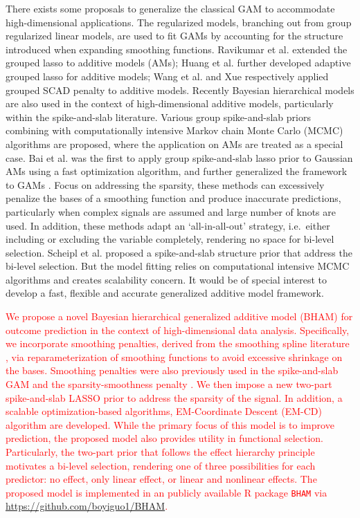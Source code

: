 \documentclass[AMA,STIX1COL,]{WileyNJD-v2}
\begin{document}
There exists some proposals to generalize the classical GAM to
accommodate high-dimensional applications. The regularized models,
branching out from group regularized linear models, are used to fit GAMs
by accounting for the structure introduced when expanding smoothing
functions. Ravikumar et al. \citep{Ravikumar2009} extended the grouped
lasso \citep{Yuan2006} to additive models (AMs); Huang et al.
\citep{Huang2010} further developed adaptive grouped lasso for additive
models; Wang et al. \citep{Wang2007} and Xue \citep{Xue2009}
respectively applied grouped SCAD penalty \citep{Fan2001} to additive
models. Recently Bayesian hierarchical models are also used in the
context of high-dimensional additive models, particularly within the
spike-and-slab literature. Various group spike-and-slab priors
\citep{Xu2015, Yang2020} combining with computationally intensive Markov
chain Monte Carlo (MCMC) algorithms are proposed, where the application
on AMs are treated as a special case. Bai et al. \citep{Bai2020} was the
first to apply group spike-and-slab lasso prior to Gaussian AMs using a
fast optimization algorithm, and further generalized the framework to
GAMs \citep{Bai2021}. Focus on addressing the sparsity, these methods
can excessively penalize the bases of a smoothing function and produce
inaccurate predictions, particularly when complex signals are assumed
and large number of knots are used. \citep{Scheipl2013} In addition,
these methods adapt an `all-in-all-out' strategy, i.e.~either including
or excluding the variable completely, rendering no space for bi-level
selection. Scheipl et al. \citep{Scheipl2012} proposed a spike-and-slab
structure prior that address the bi-level selection. But the model
fitting relies on computational intensive MCMC algorithms and creates
scalability concern. It would be of special interest to develop a fast,
flexible and accurate generalized additive model framework.

\textcolor{red}{We propose a novel Bayesian hierarchical generalized additive model (BHAM) for outcome prediction in the context of high-dimensional data analysis. Specifically, we incorporate smoothing penalties, derived from the smoothing spline literature \cite{Wood2017}, via reparameterization of smoothing functions to avoid excessive shrinkage on the bases. Smoothing penalties were also previously used in the spike-and-slab GAM \cite{Scheipl2012} and the sparsity-smoothness penalty \cite{Meier2009}. We then impose a new two-part spike-and-slab LASSO prior to address the sparsity of the signal. In addition, a scalable optimization-based algorithms, EM-Coordinate Descent (EM-CD) algorithm are developed. While the primary focus of this model is to improve prediction, the proposed model also provides utility in functional selection. Particularly, the two-part prior that follows the effect hierarchy principle motivates a bi-level selection, rendering one of three possibilities for each predictor: no effect, only linear effect, or linear and nonlinear effects. The proposed model is implemented in an publicly available R package \texttt{BHAM} via \url{https://github.com/boyiguo1/BHAM}.}
\end{document}
